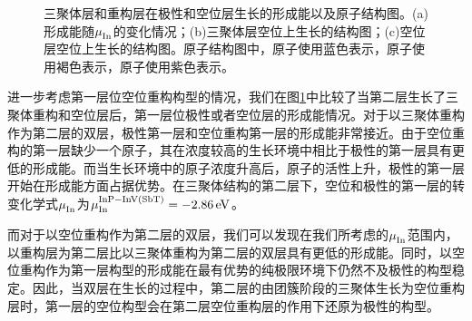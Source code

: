 \begin{figure}[htb]
\begin{minipage}[b]{0.4\textwidth}
{        }
        \newline
    \end{minipage}
    \caption{三聚体层和重构层在极性和空位层生长的形成能以及原子结构图。(a)形成能随$\it \mu_{\rm In}^{\rm } \it$的变化情况；(b)三聚体层空位上生长的结构图；(c)空位层空位上生长的结构图。原子结构图中，原子使用蓝色表示，原子使用褐色表示，原子使用紫色表示。}
    \label{fig:IS_2Linsb_InVfirstlayer}
\end{figure}

进一步考虑第一层位空位重构构型的情况，我们在图\ref{fig:IS_2Linsb_InVfirstlayer}中比较了当第二层生长了三聚体重构和空位层后，第一层位极性或者空位层的形成能情况。对于以三聚体重构作为第二层的双层，极性第一层和空位重构第一层的形成能非常接近。由于空位重构的第一层缺少一个原子，其在浓度较高的生长环境中相比于极性的第一层具有更低的形成能。而当生长环境中的原子浓度升高后，原子的活性上升，极性的第一层开始在形成能方面占据优势。在三聚体结构的第二层下，空位和极性的第一层的转变化学式$\it \mu_{\rm In}^{\rm } \it$为$\it \mu_{\rm In}^{\rm InP-InV\left(SbT\right)} \it=\SI{-2.86}{\electronvolt}$。

而对于以空位重构作为第二层的双层，我们可以发现在我们所考虑的$\it \mu_{\rm In}^{\rm } \it$范围内，以重构层为第二层比以三聚体重构为第二层的双层具有更低的形成能。同时，以空位重构作为第一层构型的形成能在最有优势的纯极限环境下仍然不及极性的构型稳定。因此，当双层在生长的过程中，第二层的由团簇阶段的三聚体生长为空位重构层时，第一层的空位构型会在第二层空位重构层的作用下还原为极性的构型。

